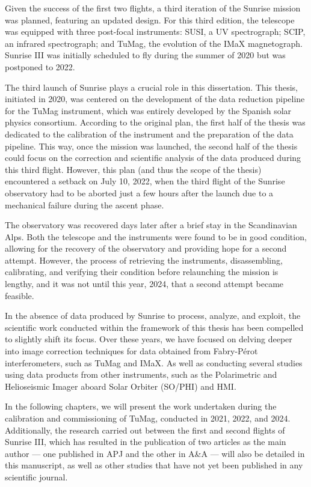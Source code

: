 \documentclass[12pt]{mythesis}
\begin{document}
Given the success of the first two flights, a third iteration of the Sunrise mission was planned, featuring an updated design. For this third edition, the telescope was equipped with three post-focal instruments: SUSI, a UV spectrograph; SCIP, an infrared spectrograph; and TuMag, the evolution of the IMaX magnetograph. Sunrise III was initially scheduled to fly during the summer of 2020 but was postponed to 2022.

The third launch of Sunrise plays a crucial role in this dissertation. This thesis, initiated in 2020, was centered on the development of the data reduction pipeline for the TuMag instrument, which was entirely developed by the Spanish solar physics consortium. According to the original plan, the first half of the thesis was dedicated to the calibration of the instrument and the preparation of the data pipeline. This way, once the mission was launched, the second half of the thesis could focus on the correction and scientific analysis of the data produced during this third flight. However, this plan (and thus the scope of the thesis) encountered a setback on July 10, 2022, when the third flight of the Sunrise observatory had to be aborted just a few hours after the launch due to a mechanical failure during the ascent phase.

The observatory was recovered days later after a brief stay in the Scandinavian Alps. Both the telescope and the instruments were found to be in good condition, allowing for the recovery of the observatory and providing hope for a second attempt. However, the process of retrieving the instruments, disassembling, calibrating, and verifying their condition before relaunching the mission is lengthy, and it was not until this year, 2024, that a second attempt became feasible.

In the absence of data produced by Sunrise to process, analyze, and exploit, the scientific work conducted within the framework of this thesis has been compelled to slightly shift its focus. Over these years, we have focused on delving deeper into image correction techniques for data obtained from Fabry-Pérot interferometers, such as TuMag and IMaX. As well as conducting several studies using data products from other instruments, such as the Polarimetric and Helioseismic Imager aboard Solar Orbiter (SO/PHI) and HMI. 

In the following chapters, we will present the work undertaken during the calibration and commissioning of TuMag, conducted in 2021, 2022, and 2024. Additionally, the research carried out between the first and second flights of Sunrise III, which has resulted in the publication of two articles as the main author — one published in APJ and the other in A\&A — will also be detailed in this manuscript, as well as other studies that have not yet been published in any scientific journal. 
\end{document}
